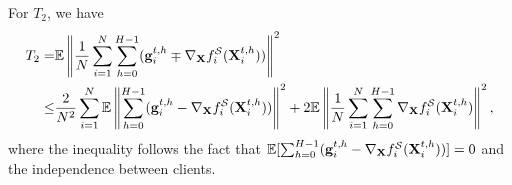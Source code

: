 \documentclass{article} %
\theoremstyle{plain}
\theoremstyle{definition}
\begin{document}

For $T_2$, we have
\begin{align}
    T_2 = & \mathbb{E}\left \| \frac{1}{N} \sum_{i=1}^{N} \sum_{h=0}^{H-1} ({\bf g}^{t,h}_i \mp \nabla_{\bf X} f_i^{\mathcal{S}} ({\bf X}_i^{t,h}))\right \|^2 \nonumber\\
    \leq & \frac{2}{N^2} \sum_{i=1}^{N} \mathbb{E}\left \|  \sum_{h=0}^{H-1} ({\bf g}^{t,h}_i -  \nabla_{\bf X} f_i^{\mathcal{S}} ({\bf X}_i^{t,h})) \right \|^2 + 2\mathbb{E}\left \| \frac{1}{N} \sum_{i=1}^{N} \sum_{h=0}^{H-1} \nabla_{\bf X} f_i^{\mathcal{S}} ({\bf X}_i^{t,h}) \right \|^2, \nonumber
\end{align}
where the inequality follows the fact that $\mathbb{E}[\sum_{h=0}^{H-1} ({\bf g}^{t,h}_i -  \nabla_{\bf X} f_i^{\mathcal{S}} ({\bf X}_i^{t,h}))] = 0$ and the independence between clients.
\end{document}

